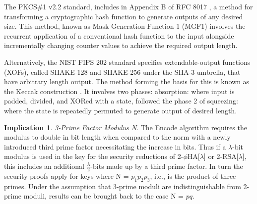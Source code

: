\documentclass[]{final_report}
\theoremstyle{definition}
\newtheorem{implication}{Implication}
\begin{document}
The PKCS\#1 v2.2 standard, includes in Appendix B of RFC 8017 \cite{rfc8017}, a method for transforming a cryptographic hash function to generate outputs of any desired size. This method, known as Mask Generation Function 1 (MGF1) involves the recurrent application of a conventional hash function to the input alongside incrementally changing counter values to achieve the required output length.

Alternatively, the NIST FIPS 202 standard \cite{1421} specifies extendable-output functions (XOFs), called SHAKE-128 and SHAKE-256 under the SHA-3 umbrella, that have arbitrary length output. The method forming the basis for this is known as the Keccak construction \cite{bertoni2011keccak}. It involves two phases: absorption: where input is padded, divided, and XORed with a state, followed the phase 2 of squeezing: where the state is repeatedly permuted to generate output of desired length.

\begin{implication} \textit{3-Prime Factor Modulus N}.
\label{IMP:3prime}
The Encode algorithm requires the modulus to double in bit length when compared to the norm with a newly introduced third prime factor necessitating the increase in bits. Thus if a \(\lambda\)-bit modulus is used in the key for the security reductions of 2-$\phi$HA[$\lambda$] or 2-RSA[\(\lambda\)], this includes an additional \(\frac{\lambda}{2}\)-bits made up by a third prime factor. In turn the security proofs apply for keys where N = $p_1 p_2 p_3$, i.e., is the product of three primes. Under the assumption that 3-prime moduli are indistinguishable from 2-prime moduli, results can be brought back to the case N = $p q$.
\end{implication}
\end{document}

